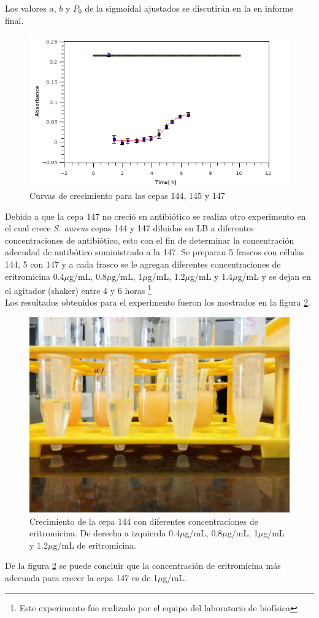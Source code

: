 \documentclass[%
 reprint,
 amsmath,amssymb,
 aps,
]{revtex4-1}
\begin{document}
 Los valores $a$, $b$ y $P_{0}$ de la sigmoidal ajustados se discutirán en la en informe final.
\begin{figure}[h]
\includegraphics[width=\linewidth]{curvas/gra145dia2.png}
  \caption{Curvas de crecimiento para las cepas 144, 145 y 147}
  \label{fig:cur4}
\end{figure}
Debido a que la cepa 147 no creció en antibiótico se realiza otro experimento en el cual crece \textit{S. aureus} cepas 144 y 147 diluidas en LB a diferentes concentraciones de antibiótico, esto con el fin de determinar la concentración adecudad de antibótico suministrado a la 147. Se preparan 5 frascos con células 144, 5 con 147 y a cada frasco se le agregan diferentes concentraciones de eritromicina 0.4$\mu$g/mL, 0.8$\mu$g/mL, 1$\mu$g/mL, 1.2$\mu$g/mL y 1.4$\mu$g/mL y se dejan en el agitador (shaker) entre 4 y 6 horas \footnote{Este experimento fue realizado por el equipo del laboratorio de biofísica}\\
Los resultados obtenidos para el experimento fueron los mostrados en la figura \ref{fig:144_eri}.
\begin{figure}[h]
\includegraphics[scale=0.04]{144_eri.jpg}
  \caption{Crecimiento de la cepa 144 con diferentes concentraciones de  eritromicina. De derecha a izquierda 0.4$\mu$g/mL, 0.8$\mu$g/mL, 1$\mu$g/mL y 1.2$\mu$g/mL de  eritromicina.}
  \label{fig:144_eri}
\end{figure}
De la figura \ref{fig:144_eri} se puede concluir que la concentración de eritromicina más adecuada para crecer la cepa 147 es de 1$\mu$g/mL.
\end{document}

